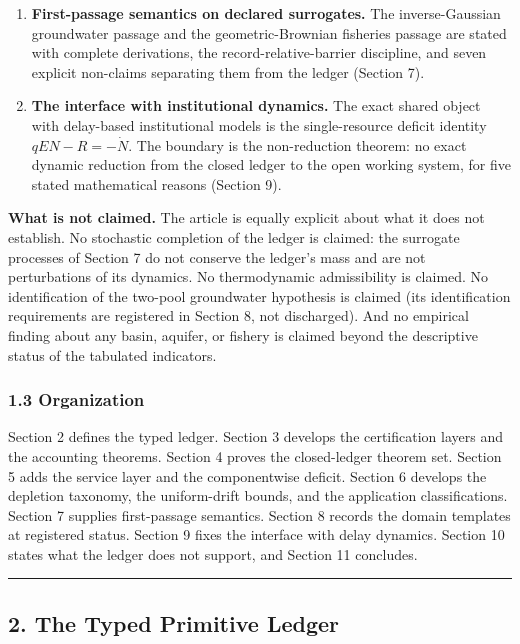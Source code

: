 \documentclass[11pt]{article}
\begin{document}
\begin{enumerate}
  the published critiques they corroborate (Section 6.5).
\item
  \textbf{First-passage semantics on declared surrogates.} The
  inverse-Gaussian groundwater passage and the geometric-Brownian
  fisheries passage are stated with complete derivations, the
  record-relative-barrier discipline, and seven explicit non-claims
  separating them from the ledger (Section 7).
\item
  \textbf{The interface with institutional dynamics.} The exact shared
  object with delay-based institutional models is the single-resource
  deficit identity \(qEN - R = -\dot N\). The boundary is the
  non-reduction theorem: no exact dynamic reduction from the closed
  ledger to the open working system, for five stated mathematical
  reasons (Section 9).
\end{enumerate}

\textbf{What is not claimed.} The article is equally explicit about what
it does not establish. No stochastic completion of the ledger is
claimed: the surrogate processes of Section 7 do not conserve the
ledger's mass and are not perturbations of its dynamics. No
thermodynamic admissibility is claimed. No identification of the
two-pool groundwater hypothesis is claimed (its identification
requirements are registered in Section 8, not discharged). And no
empirical finding about any basin, aquifer, or fishery is claimed beyond
the descriptive status of the tabulated indicators.

\subsubsection{1.3 Organization}\label{organization}

Section 2 defines the typed ledger. Section 3 develops the certification
layers and the accounting theorems. Section 4 proves the closed-ledger
theorem set. Section 5 adds the service layer and the componentwise
deficit. Section 6 develops the depletion taxonomy, the uniform-drift
bounds, and the application classifications. Section 7 supplies
first-passage semantics. Section 8 records the domain templates at
registered status. Section 9 fixes the interface with delay dynamics.
Section 10 states what the ledger does not support, and Section 11
concludes.

\begin{center}\rule{0.5\linewidth}{0.5pt}\end{center}

\subsection{2. The Typed Primitive
Ledger}\label{the-typed-primitive-ledger}
\end{document}
